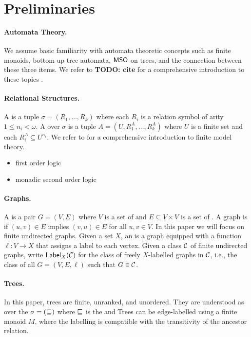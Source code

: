 \section{Preliminaries}
\label{sec:preliminaries}

\paragraph*{Automata Theory.} We assume basic familiarity with
automata theoretic concepts such as finite monoids, bottom-up tree automata,
$\mathsf{MSO}$ on trees, and the connection between these three items. We refer to
\textbf{TODO: cite} for a comprehensive introduction to these topics
 \cite{THOM97}.

\paragraph*{Relational Structures.} A  is a tuple
$\sigma = (R_1, \ldots, R_k)$ where each $R_i$ is a relation symbol of arity $1
\leq n_i < \omega$. A  over $\sigma$ is a tuple $A
= (U, R_1^A, \ldots, R_k^A)$ where $U$ is a finite set and each $R_i^A
\subseteq U^{n_i}$. We refer to \cite{EBBFLU95} for a comprehensive introduction
to finite model theory.

\begin{itemize}
    \item first order logic 
    \item monadic second order logic
\end{itemize}

\paragraph*{Graphs.} A  is a pair $G = (V, E)$ where $V$ is a set
of  and $E \subseteq V \times V$ is a set of . A
graph is  if $(u, v) \in E$ implies $(v, u) \in E$ for all
$u, v \in V$. In this paper we will focus on finite undirected graphs. Given a
set $X$, an  is a graph equipped with a function
$\ell \colon V \to X$ that assigns a label to each vertex. Given a class $\mathcal{C}$
of finite undirected graphs, write $\mathsf{Label}_{X}(\mathcal{C})$ for the class of freely
$X$-labelled graphs in $\mathcal{C}$, i.e., the class of all 
$G = (V, E, \ell)$ such that $G \in \mathcal{C}$.

\paragraph*{Trees.} In this paper, trees are finite, unranked, and unordered.
They are understood as  over the 
$\sigma = (\treeleq)$ where $\treeleq$ is the  and Trees
can be edge-labelled using a finite monoid $M$, where the labelling is
compatible with the transitivity of the ancestor relation.

